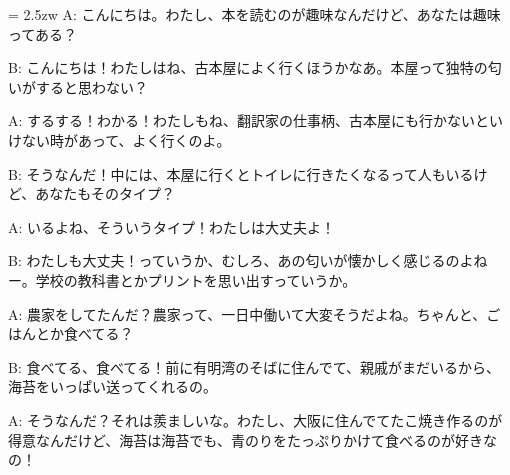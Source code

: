 \documentclass[11pt]{amsart}
\title{}
\author{}
\newenvironment{hangall}[1]{\hangindent = 2.5zw\everypar{\hangindent = 2.5zw}}{}
\begin{document}
\maketitle
\begin{hangall}{}%
A: こんにちは。わたし、本を読むのが趣味なんだけど、あなたは趣味ってある？



B: こんにちは！わたしはね、古本屋によく行くほうかなあ。本屋って独特の匂いがすると思わない？



A: するする！わかる！わたしもね、翻訳家の仕事柄、古本屋にも行かないといけない時があって、よく行くのよ。



B: そうなんだ！中には、本屋に行くとトイレに行きたくなるって人もいるけど、あなたもそのタイプ？



A: いるよね、そういうタイプ！わたしは大丈夫よ！



B: わたしも大丈夫！っていうか、むしろ、あの匂いが懐かしく感じるのよねー。学校の教科書とかプリントを思い出すっていうか。



A: 農家をしてたんだ？農家って、一日中働いて大変そうだよね。ちゃんと、ごはんとか食べてる？



B: 食べてる、食べてる！前に有明湾のそばに住んでて、親戚がまだいるから、海苔をいっぱい送ってくれるの。



A: そうなんだ？それは羨ましいな。わたし、大阪に住んでてたこ焼き作るのが得意なんだけど、海苔は海苔でも、青のりをたっぷりかけて食べるのが好きなの！\end{hangall}
\end{document}
